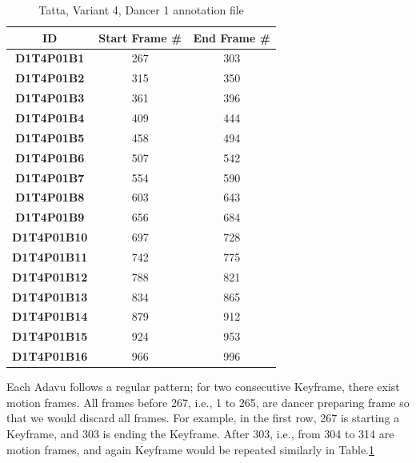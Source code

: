 \begin{table}[]
\centering
\begin{tabular}{|c|c|c|}
\hline
\textbf{ID}         & \textbf{Start Frame \#} & \textbf{End Frame \#} \\ \hline
\textbf{D1T4P01B1}  & 267                    & 303                  \\ \hline
\textbf{D1T4P01B2}  & 315                    & 350                  \\ \hline
\textbf{D1T4P01B3}  & 361                    & 396                  \\ \hline
\textbf{D1T4P01B4}  & 409                    & 444                  \\ \hline
\textbf{D1T4P01B5}  & 458                    & 494                  \\ \hline
\textbf{D1T4P01B6}  & 507                    & 542                  \\ \hline
\textbf{D1T4P01B7}  & 554                    & 590                  \\ \hline
\textbf{D1T4P01B8}  & 603                    & 643                  \\ \hline
\textbf{D1T4P01B9}  & 656                    & 684                  \\ \hline
\textbf{D1T4P01B10} & 697                    & 728                  \\ \hline
\textbf{D1T4P01B11} & 742                    & 775                  \\ \hline
\textbf{D1T4P01B12} & 788                    & 821                  \\ \hline
\textbf{D1T4P01B13} & 834                    & 865                  \\ \hline
\textbf{D1T4P01B14} & 879                    & 912                  \\ \hline
\textbf{D1T4P01B15} & 924                    & 953                  \\ \hline
\textbf{D1T4P01B16} & 966                    & 996                  \\ \hline
\end{tabular}
\caption{Tatta, Variant 4, Dancer 1 annotation file}
\label{tab:Ch01T02}
\end{table}


Each Adavu follows a regular pattern; for two consecutive Keyframe, there exist motion frames. All frames before 267, i.e., 1 to 265, are dancer preparing frame so that we would discard all frames. For example, in the first row, 267 is starting a Keyframe, and 303 is ending the Keyframe. After 303, i.e., from 304 to 314 are motion frames, and again Keyframe would be repeated similarly in Table.\ref{tab:Ch01T02}
